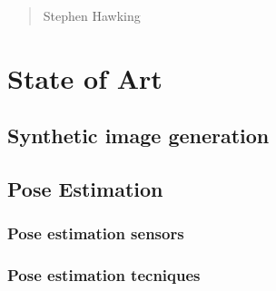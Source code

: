 \begin{quotation}
{\footnotesize
{}
\begin{flushright}
Stephen Hawking
\end{flushright}
}
\end{quotation}
\vspace{0.5cm}

\section{State of Art}

\subsection{Synthetic image generation}

\subsection{Pose Estimation}

\subsubsection{Pose estimation sensors}

\subsubsection{Pose estimation tecniques}

